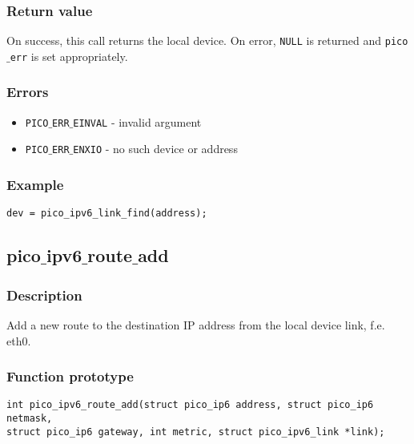 \subsubsection*{Return value}
On success, this call returns the local device.
On error, \texttt{NULL} is returned and \texttt{pico$\_$err} is set appropriately.

\subsubsection*{Errors}
\begin{itemize}[noitemsep]
\item \texttt{PICO$\_$ERR$\_$EINVAL} - invalid argument
\item \texttt{PICO$\_$ERR$\_$ENXIO} - no such device or address
\end{itemize}

\subsubsection*{Example}
\begin{verbatim}
dev = pico_ipv6_link_find(address);
\end{verbatim}




\subsection{pico$\_$ipv6$\_$route$\_$add}

\subsubsection*{Description}
Add a new route to the destination IP address from the local device link, f.e. eth0.

\subsubsection*{Function prototype}
\begin{verbatim}
int pico_ipv6_route_add(struct pico_ip6 address, struct pico_ip6 netmask,
struct pico_ip6 gateway, int metric, struct pico_ipv6_link *link);
\end{verbatim}

